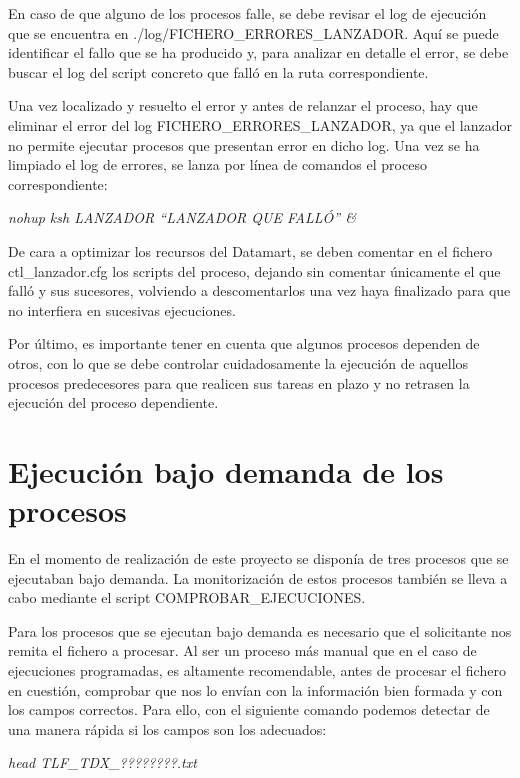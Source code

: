 \documentclass[a4paper, 12pt]{book}
\begin{document}
En caso de que alguno de los procesos falle, se debe revisar el log de ejecución que se encuentra en ./log/FICHERO\_ERRORES\_LANZADOR. Aquí se puede identificar el fallo que se ha producido y, para analizar en detalle el error, se debe buscar el log del script concreto que falló en la ruta correspondiente.

Una vez localizado y resuelto el error y antes de relanzar el proceso, hay que eliminar el error del log FICHERO\_ERRORES\_LANZADOR, ya que el lanzador no permite ejecutar procesos que presentan error en dicho log. Una vez se ha limpiado el log de errores, se lanza por línea de comandos el proceso correspondiente:

\begin{center}
	\textit{nohup ksh LANZADOR “LANZADOR QUE FALLÓ” &}
\end{center}

De cara a optimizar los recursos del Datamart, se deben comentar en el fichero ctl\_lanzador.cfg los scripts del proceso, dejando sin comentar únicamente el que falló y sus sucesores, volviendo a descomentarlos una vez haya finalizado para que no interfiera en sucesivas ejecuciones.

Por último, es importante tener en cuenta que algunos procesos dependen de otros, con lo que se debe controlar cuidadosamente la ejecución de aquellos procesos predecesores para que realicen sus tareas en plazo y no retrasen la ejecución del proceso dependiente.

\section{Ejecución bajo demanda de los procesos} 
\label{sec:ejecucion_demanda}
En el momento de realización de este proyecto se disponía de tres procesos que se ejecutaban bajo demanda. La monitorización de estos procesos también se lleva a cabo mediante el script COMPROBAR\_EJECUCIONES.

Para los procesos que se ejecutan bajo demanda es necesario que el solicitante nos remita el fichero a procesar. Al ser un proceso más manual que en el caso de ejecuciones programadas, es altamente recomendable, antes de procesar el fichero en cuestión, comprobar que nos lo envían con la información bien formada y con los campos correctos. Para ello, con el siguiente comando podemos detectar de una manera rápida si los campos son los adecuados:
\begin{center}
	\textit{head TLF\_TDX\_????????.txt}
\end{center}
\end{document}
